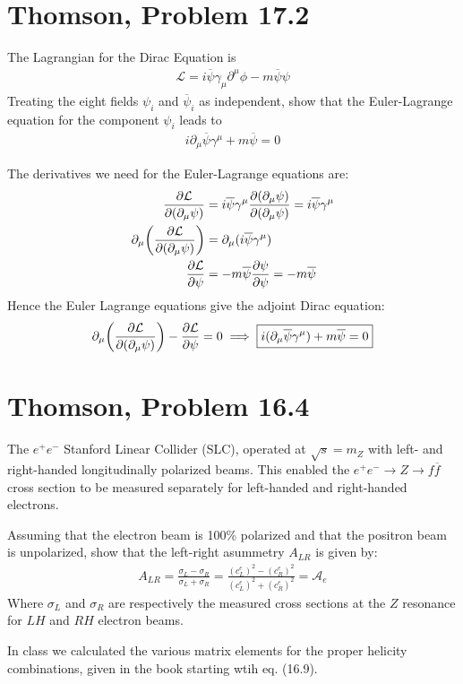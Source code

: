 \documentclass[12pt]{article}
\renewcommand{\L}{\mathcal{L}}
\newcommand{\D}{\partial}
\begin{document}
\section{Thomson, Problem 17.2}
\begin{problem}
  The Lagrangian for the Dirac Equation is
  \begin{align*}
    \L=i\overline{\psi}\gamma_\mu\D^\mu\phi-m\overline{\psi}\psi
  \end{align*}
  Treating the eight fields $\psi_i$ and $\overline{\psi}_i$ as independent, show that the Euler-Lagrange equation for the component $\psi_i$ leads to
  \begin{align*}
    i\D_\mu\overline{\psi}\gamma^\mu+m\overline{\psi}=0
  \end{align*}
\end{problem}
The derivatives we need for the Euler-Lagrange equations are:
\begin{align*}
  \pdv{\L}{(\D_\mu\psi)}&=i\overline{\psi}\gamma^\mu
  \pdv{(\D_\mu\psi)}{(\D_\mu\psi)}=i\overline{\psi}\gamma^\mu\\
  \D_\mu\qty(\pdv{\L}{(\D_\mu\psi)})&=\D_\mu(i\overline{\psi}\gamma^\mu)\\
  \pdv{\L}{\psi}&=-m\overline{\psi}\pdv{\psi}{\psi}=-m\overline{\psi}
\end{align*}
Hence the Euler Lagrange equations give the adjoint Dirac equation:
\begin{equation}
  \label{eq:p5}
  \D_\mu\qty(\pdv{\L}{(\D_\mu\psi)})-\pdv{\L}{\psi}=0\implies
  \boxed{i(\D_\mu\overline{\psi}\gamma^\mu)+m\overline{\psi}=0}
\end{equation}
\newpage
\section{Thomson, Problem 16.4}
\begin{problem}
  The $e^+e^-$ Stanford Linear Collider (SLC), operated at $\sqrt{s}=m_Z$ with left- and right-handed longitudinally polarized beams. This enabled the $e^+e^-\to Z\to f\overline{f}$ cross section to be measured separately for left-handed and right-handed electrons.

  Assuming that the electron beam is 100\% polarized and that the positron beam is unpolarized, show that the left-right asummetry $A_{LR}$ is given by:
  \begin{align*}
    A_{LR}=\frac{\sigma_L-\sigma_R}{\sigma_L+\sigma_R}
    =\frac{(c^e_L)^2-(c^e_R)^2}{(c^e_L)^2+(c^e_R)^2}=\mathcal{A}_e
  \end{align*}
  Where $\sigma_L$ and $\sigma_R$ are respectively the measured cross sections at the $Z$ resonance for $LH$ and $RH$ electron beams.
\end{problem}
In class we calculated the various matrix elements for the proper helicity combinations, given in the book starting  wtih eq. (16.9).
\end{document}
